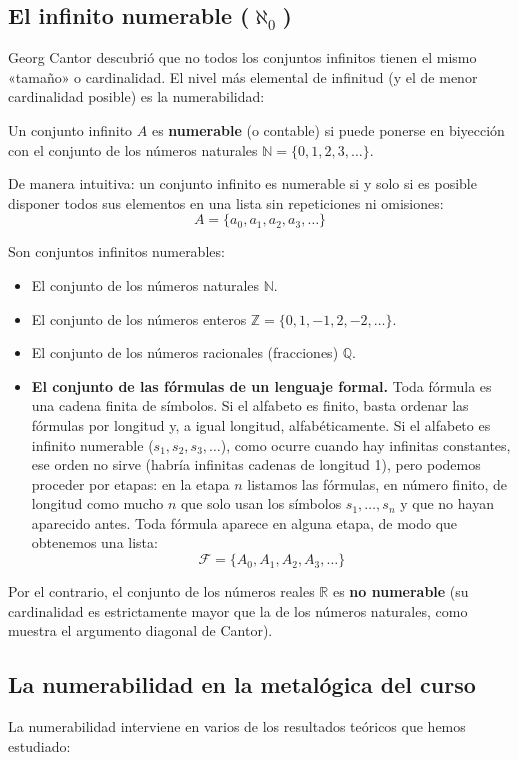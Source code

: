 \subsection{El infinito numerable (\texorpdfstring{$\aleph_0$}{alef-0})}
Georg Cantor descubrió que no todos los conjuntos infinitos tienen el
mismo «tamaño» o cardinalidad. El nivel más elemental de infinitud
(y el de menor cardinalidad posible) es la numerabilidad:

\begin{definicion}
Un conjunto infinito $A$ es \textbf{numerable} (o contable) si puede ponerse en biyección con el conjunto de los números naturales $\mathbb{N} = \{0, 1, 2, 3, \dots\}$.

De manera intuitiva: un conjunto infinito es numerable si y solo si es posible disponer todos sus elementos en una lista sin repeticiones ni omisiones:
\[
A = \{a_0, a_1, a_2, a_3, \dots\}
\]
\end{definicion}

Son conjuntos infinitos numerables:
\begin{itemize}
    \item El conjunto de los números naturales $\mathbb{N}$.
    \item El conjunto de los números enteros $\mathbb{Z} = \{0, 1, -1, 2, -2, \dots\}$.
    \item El conjunto de los números racionales (fracciones) $\mathbb{Q}$.
    \item \textbf{El conjunto de las fórmulas de un lenguaje formal.} Toda fórmula es una cadena finita de símbolos. Si el alfabeto es finito, basta ordenar las fórmulas por longitud y, a igual longitud, alfabéticamente. Si el alfabeto es infinito numerable ($s_1, s_2, s_3, \dots$), como ocurre cuando hay infinitas constantes, ese orden no sirve (habría infinitas cadenas de longitud 1), pero podemos proceder por etapas: en la etapa $n$ listamos las fórmulas, en número finito, de longitud como mucho $n$ que solo usan los símbolos $s_1, \dots, s_n$ y que no hayan aparecido antes. Toda fórmula aparece en alguna etapa, de modo que obtenemos una lista:
    \[
    \mathcal{F} = \{A_0, A_1, A_2, A_3, \dots\}
    \]
\end{itemize}

Por el contrario, el conjunto de los números reales $\mathbb{R}$ es \textbf{no numerable} (su cardinalidad es estrictamente mayor que la de los números naturales, como muestra el argumento diagonal de Cantor).

\subsection{La numerabilidad en la metalógica del curso}
La numerabilidad interviene en varios de los resultados teóricos que
hemos estudiado:

